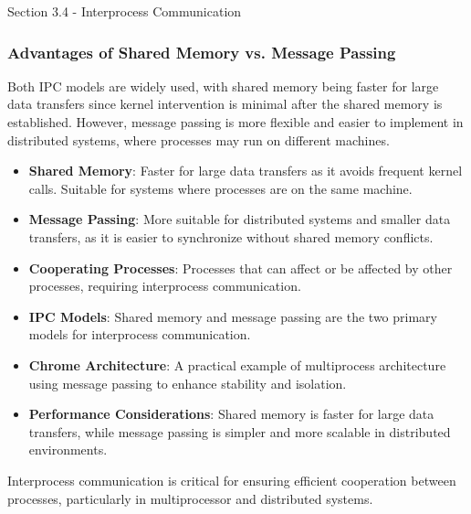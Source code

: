 \begin{notes}{Section 3.4 - Interprocess Communication}
\begin{highlight}
    \end{highlight}
    
    \subsubsection*{Advantages of Shared Memory vs. Message Passing}
    
    Both IPC models are widely used, with shared memory being faster for large data transfers since kernel intervention is minimal after the shared memory is established. However, message passing is 
    more flexible and easier to implement in distributed systems, where processes may run on different machines.
    
    \begin{highlight}
    
        \begin{itemize}
            \item \textbf{Shared Memory}: Faster for large data transfers as it avoids frequent kernel calls. Suitable for systems where processes are on the same machine.
            \item \textbf{Message Passing}: More suitable for distributed systems and smaller data transfers, as it is easier to synchronize without shared memory conflicts.
        \end{itemize}
    
    \end{highlight}
    
    \begin{highlight}
    
        \begin{itemize}
            \item \textbf{Cooperating Processes}: Processes that can affect or be affected by other processes, requiring interprocess communication.
            \item \textbf{IPC Models}: Shared memory and message passing are the two primary models for interprocess communication.
            \item \textbf{Chrome Architecture}: A practical example of multiprocess architecture using message passing to enhance stability and isolation.
            \item \textbf{Performance Considerations}: Shared memory is faster for large data transfers, while message passing is simpler and more scalable in distributed environments.
        \end{itemize}
    
    Interprocess communication is critical for ensuring efficient cooperation between processes, particularly in multiprocessor and distributed systems.
    
    \end{highlight}
\end{notes}

